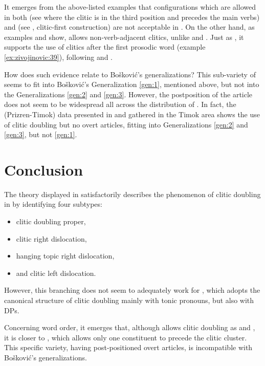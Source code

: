 \documentclass[output=paper,
colorlinks,
citecolor=brown,
newtxmath
]{langscibook}
\begin{document}
\noindent It emerges from the above-listed examples that configurations which are allowed in both  (see  where the clitic is in the third position and precedes the main verbs) and  (see , clitic-first construction) are not acceptable in . On the other hand, as examples  and  show,  allows non-verb-adjacent clitics, unlike  and . Just as , it supports the use of clitics after the first prosodic word (example \ref{ex:zivojinovic:39}), following \citet{Boskovic2001} and \citet{Radanovic-Kocic1988}.

How does such evidence relate to Bošković’s generalizations? This sub-variety of  seems to fit into Bošković’s Generalization \ref{gen:1}, mentioned above, but not into the Generalizations \ref{gen:2} and \ref{gen:3}. However, the postposition of the article does not seem to be widespread all across the distribution of . In fact, the  (Prizren-Timok) data presented in \citet{Runic2014} and gathered in the Timok area shows the use of clitic doubling but no overt articles, fitting into Generalizations \ref{gen:2} and \ref{gen:3}, but not \ref{gen:1}.
%
%
\section{Conclusion}

The theory displayed in \citet{Cinque.Krapova2008} satisfactorily describes the phenomenon of clitic doubling in  by identifying four subtypes:
\begin{itemize}
\item clitic doubling proper,
\item clitic right dislocation,
\item hanging topic right dislocation,
\item and clitic left dislocation.
\end{itemize}
However, this branching does not seem to adequately work for , which adopts the canonical structure of clitic doubling mainly with tonic pronouns, but also with DPs.

Concerning word order, it emerges that, although  allows clitic doubling as  and , it is closer to , which allows only one constituent to precede the clitic cluster. This specific variety, having post-positioned overt articles, is incompatible with Bošković’s generalizations.
\end{document}
